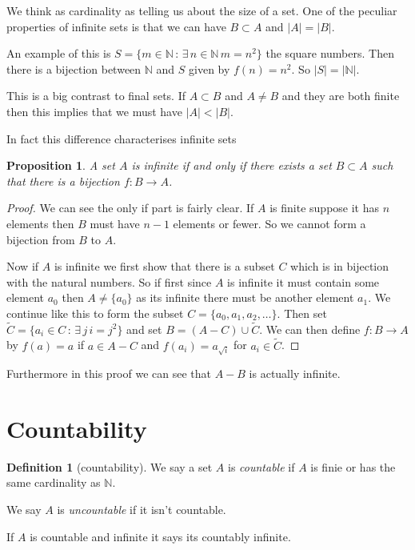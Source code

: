 \documentclass[
]{book}
\newtheorem{proposition}{Proposition}[chapter]
\theoremstyle{definition}
\newtheorem{definition}{Definition}[chapter]
\theoremstyle{definition}
\theoremstyle{definition}
\theoremstyle{definition}
\theoremstyle{remark}
\begin{document}
We think as cardinality as telling us about the size of a set. One of the peculiar properties of infinite sets is that we can have \(B \subset A\) and \(|A| = |B|\).

An example of this is \(S=\{m \in \mathbb{N} \,:\, \exists \, n \in \mathbb{N} \, m=n^2\}\) the square numbers. Then there is a bijection between \(\mathbb{N}\) and \(S\) given by \(f(n) = n^2\). So \(|S| = |\mathbb{N}|\).

This is a big contrast to final sets. If \(A \subset B\) and \(A \neq B\) and they are both finite then this implies that we must have \(|A| < |B|\).

In fact this difference characterises infinite sets

\begin{proposition}
A set \(A\) is infinite if and only if there exists a set \(B \subset A\) such that there is a bijection \(f: B \rightarrow A\).
\end{proposition}

\begin{proof}
We can see the only if part is fairly clear. If \(A\) is finite suppose it has \(n\) elements then \(B\) must have \(n-1\) elements or fewer. So we cannot form a bijection from \(B\) to \(A\).

Now if \(A\) is infinite we first show that there is a subset \(C\) which is in bijection with the natural numbers. So if first since \(A\) is infinite it must contain some element \(a_0\) then \(A \neq \{a_0\}\) as its infinite there must be another element \(a_1\). We continue like this to form the subset \(C = \{a_0, a_1, a_2, \dots \}\). Then set \(\tilde{C} = \{a_i \in C \,:\, \exists \, j \, i=j^2\}\) and set \(B = (A-C)\cup \tilde{C}\). We can then define \(f: B \rightarrow A\) by \(f(a) = a\) if \(a \in A-C\) and \(f(a_i) = a_{\sqrt{i}}\) for \(a_i \in \tilde{C}\).
\end{proof}

Furthermore in this proof we can see that \(A-B\) is actually infinite.

\section{Countability}\label{countability}

\begin{definition}[countability]
We say a set \(A\) is \emph{countable} if \(A\) is finie or has the same cardinality as \(\mathbb{N}\).

We say \(A\) is \emph{uncountable} if it isn't countable.

If \(A\) is countable and infinite it says its countably infinite.
\end{definition}
\end{document}
